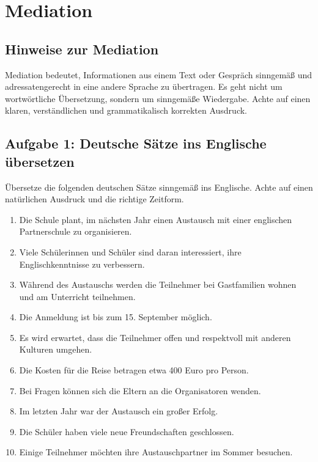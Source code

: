 
\section*{Mediation}

\subsection*{Hinweise zur Mediation}
Mediation bedeutet, Informationen aus einem Text oder Gespräch sinngemäß und adressatengerecht in eine andere Sprache zu übertragen. Es geht nicht um wortwörtliche Übersetzung, sondern um sinngemäße Wiedergabe. Achte auf einen klaren, verständlichen und grammatikalisch korrekten Ausdruck.

\subsection*{Aufgabe 1: Deutsche Sätze ins Englische übersetzen}
Übersetze die folgenden deutschen Sätze sinngemäß ins Englische. Achte auf einen natürlichen Ausdruck und die richtige Zeitform.

\begin{enumerate}
    \item Die Schule plant, im nächsten Jahr einen Austausch mit einer englischen Partnerschule zu organisieren.
    \item Viele Schülerinnen und Schüler sind daran interessiert, ihre Englischkenntnisse zu verbessern.
    \item Während des Austauschs werden die Teilnehmer bei Gastfamilien wohnen und am Unterricht teilnehmen.
    \item Die Anmeldung ist bis zum 15. September möglich.
    \item Es wird erwartet, dass die Teilnehmer offen und respektvoll mit anderen Kulturen umgehen.
    \item Die Kosten für die Reise betragen etwa 400 Euro pro Person.
    \item Bei Fragen können sich die Eltern an die Organisatoren wenden.
    \item Im letzten Jahr war der Austausch ein großer Erfolg.
    \item Die Schüler haben viele neue Freundschaften geschlossen.
    \item Einige Teilnehmer möchten ihre Austauschpartner im Sommer besuchen.
\end{enumerate}

